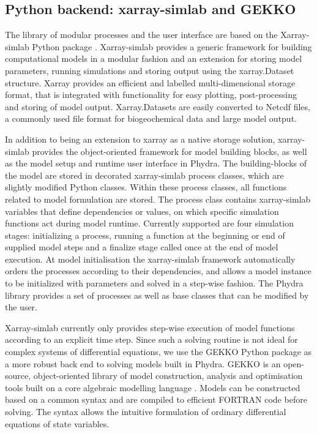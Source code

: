 \documentclass[journal abbreviations, manuscript]{copernicus}
\begin{document}
\subsection{Python backend: xarray-simlab and GEKKO}

The library of modular processes and the user interface are based on the Xarray-simlab Python package \citep{Bovy2018Xarray-simlab:Interactively}. Xarray-simlab provides a generic framework for building computational models in a modular fashion and an extension for storing model parameters, running simulations and storing output using the xarray.Dataset structure. Xarray provides an efficient and labelled multi-dimensional storage format, that is integrated with functionality for easy plotting, post-processing and storing of model output. Xarray.Datasets are easily converted to Netcdf files, a commonly used file format for biogeochemical data and large model output. 

In addition to being an extension to xarray as a native storage solution, xarray-simlab provides the object-oriented framework for model building blocks, as well as the model setup and runtime user interface in Phydra. The building-blocks of the model are stored in decorated xarray-simlab process classes, which are slightly modified Python classes. Within these process classes, all functions related to model formulation are stored. The process class contains xarray-simlab variables that define dependencies or values, on which specific simulation functions act during model runtime. Currently supported are four simulation stages: initializing a process, running a function at the beginning or end of supplied model steps and a finalize stage called once at the end of model execution. At model initialisation the xarray-simlab framework automatically orders the processes according to their dependencies, and allows a model instance to be initialized with parameters and solved in a step-wise fashion. The Phydra library provides a set of processes as well as base classes that can be modified by the user.

Xarray-simlab currently only provides step-wise execution of model functions according to an explicit time step. Since such a solving routine is not ideal for complex systems of differential equations, we use the GEKKO Python package as a more robust back end to solving models built in Phydra. GEKKO is an open-source, object-oriented library of model construction, analysis and optimisation tools built on a core algebraic modelling language \citep{Beal2018GEKKOSuite}. Models can be constructed based on a common syntax and are compiled to efficient FORTRAN code before solving. The syntax allows the intuitive formulation of ordinary differential equations of state variables.
\end{document}
